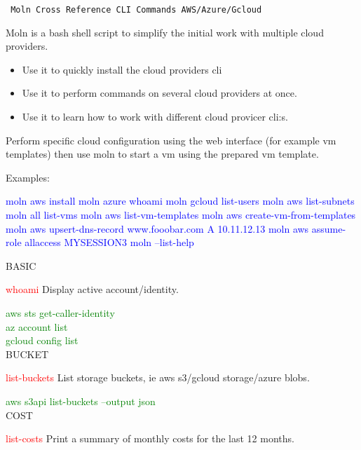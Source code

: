\documentclass{article}
\newcommand{\cmd}[1]{\textcolor{Red}{#1}}
\newcommand{\help}[1]{#1\par}
\newcommand{\cloud}[1]{\textcolor{Green}{#1}\\}
\begin{document}
\tt
    {\Large Moln Cross Reference CLI Commands AWS/Azure/Gcloud}

    Moln is a bash shell script to simplify the initial work with multiple cloud providers.

    \begin{itemize}
    \item{Use it to quickly install the cloud providers cli}
    \item{Use it to perform commands on several cloud providers at once.}
    \item{Use it to learn how to work with different cloud provicer cli:s.}
    \end{itemize}

    Perform specific cloud configuration using the web interface (for example vm templates)
    then use moln to start a vm using the prepared vm template.

    Examples:

    \textcolor{Blue}{moln aws install} \linebreak
    \textcolor{Blue}{moln azure whoami} \linebreak
    \textcolor{Blue}{moln gcloud list-users} \linebreak
    \textcolor{Blue}{moln aws list-subnets} \linebreak
    \textcolor{Blue}{moln all list-vms} \linebreak
    \textcolor{Blue}{moln aws list-vm-templates} \linebreak
    \textcolor{Blue}{moln aws create-vm-from-templates} \linebreak
    \textcolor{Blue}{moln aws upsert-dns-record www.fooobar.com A 10.11.12.13} \linebreak
    \textcolor{Blue}{moln aws assume-role allaccess MYSESSION3} \linebreak
    \textcolor{Blue}{moln --list-help} \linebreak
    \par{\large BASIC}\par
\cmd{whoami} \help{Display active account/identity.}
\cloud{aws sts get-caller-identity}
\cloud{az account list}
\cloud{gcloud config list}

{\large BUCKET}\par
\cmd{list-buckets} \help{List storage buckets, ie aws s3/gcloud storage/azure blobs.}
\cloud{aws s3api list-buckets --output json}

{\large COST}\par
\cmd{list-costs} \help{Print a summary of monthly costs for the last 12 months.}
\end{document}
